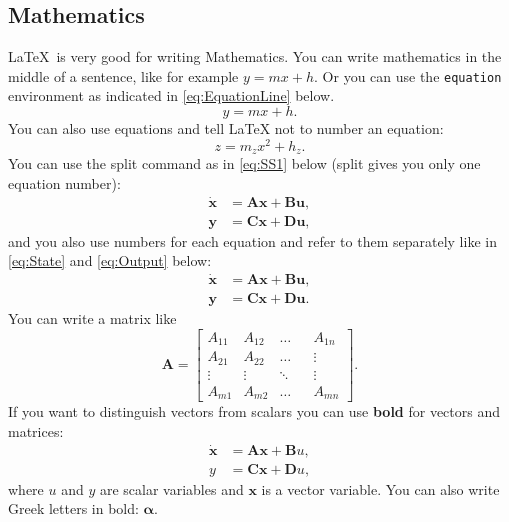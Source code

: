 \documentclass{UoNMCHA}
\numberwithin{equation}{section}
\begin{document}
\subsection{Mathematics}
\LaTeX \ is very good for writing Mathematics. You can write mathematics in the middle of a sentence, like for example $y=m x + h$. Or you can use the \verb|equation| environment as indicated in \eqref{eq:EquationLine} below.
\begin{equation}\label{eq:EquationLine}
    y=m x + h.
\end{equation}
You can also use equations and tell LaTeX not to number an equation:
\begin{equation*}
    z=m_z x^2 + h_z.
\end{equation*}
You can use the split command as in \eqref{eq:SS1} below (split gives you only one equation number):
\begin{equation}\label{eq:SS1}
    \begin{split}
        \dot{\mathbf{x}} &= \mathbf{A} \mathbf{x} + \mathbf{B} \mathbf{u}, \\
        \mathbf{y} &= \mathbf{C} \mathbf{x} + \mathbf{D} \mathbf{u},
    \end{split}
\end{equation}
and you also use numbers for each equation and refer to them separately like in \eqref{eq:State} and \eqref{eq:Output} below:
\begin{align}
    \dot{\mathbf{x}} &= \mathbf{A} \mathbf{x} + \mathbf{B} \mathbf{u},  \label{eq:State} \\
    \mathbf{y} &= \mathbf{C} \mathbf{x} + \mathbf{D} \mathbf{u}. \label{eq:Output} 
\end{align}
You can write a matrix like
\begin{equation*}
    \mathbf{A} =
    \begin{bmatrix}
        A_{11} & A_{12} & \dots & &A_{1n} \\
        A_{21} & A_{22} &  \dots & &\vdots \\
        \vdots & \vdots & \ddots& &  \vdots\\
        A_{m1} & A_{m2} & \dots & &A_{mn}
    \end{bmatrix}.
\end{equation*}
If you want to distinguish vectors from scalars you can use \textbf{bold} for vectors and matrices:
\begin{equation*} 
    \begin{split}
        \dot{\mathbf{x}} &= \mathbf{A} \mathbf{x} + \mathbf{B} u, \\
        y &= \mathbf{C} \mathbf{x} + \mathbf{D} u,
    \end{split}
\end{equation*}
where $u$ and $y$ are scalar variables and $\mathbf{x}$ is a vector variable.
You can also write Greek letters in bold: $\boldsymbol{\alpha}$.
\end{document}
